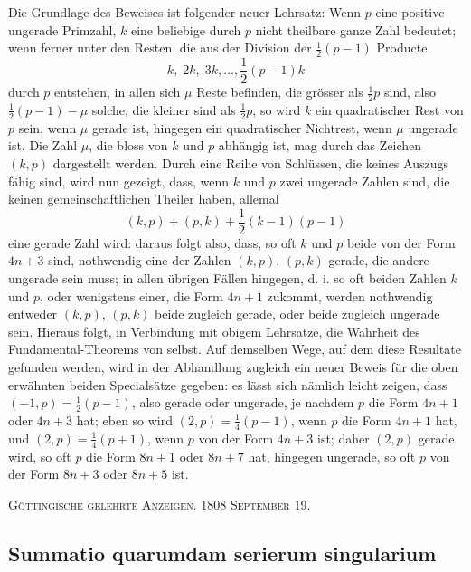 \documentclass[12pt]{article}
\begin{document}
Die Grundlage des Beweises ist folgender neuer Lehrsatz: Wenn $p$ eine positive ungerade Primzahl, $k$ eine beliebige durch $p$ nicht theilbare ganze Zahl bedeutet; wenn ferner unter den Resten, die aus der Division der $\frac12(p-1)$ Producte
\[
 k,\;2k,\;3k,\ldots,\frac12(p-1)k
\]
durch $p$ entstehen, in allen sich $\mu$ Reste befinden, die grösser als $\frac12 p$ sind, also $\frac12(p-1)-\mu$ solche, die kleiner sind als $\frac12p$, so wird $k$ ein quadratischer Rest von $p$ sein, wenn $\mu$ gerade ist, hingegen ein quadratischer Nichtrest, wenn $\mu$ ungerade ist. Die Zahl $\mu$, die bloss von $k$ und $p$ abhängig ist, mag durch das Zeichen $(k,p)$ dargestellt werden. Durch eine Reihe von Schlüssen, die keines Auszugs fähig sind, wird nun gezeigt, dass, wenn $k$ und $p$ zwei ungerade Zahlen sind, die keinen gemeinschaftlichen Theiler haben, allemal
\[
 (k,p)+(p,k)+\frac12(k-1)(p-1)
\]
eine gerade Zahl wird: daraus folgt also, dass, so oft $k$ und $p$ beide von der Form $4n+3$ sind, nothwendig eine der Zahlen $(k,p)$, $(p,k)$ gerade, die andere ungerade sein muss; in allen übrigen Fällen hingegen, d. i. so oft beiden Zahlen $k$ und $p$, oder wenigstens einer, die Form $4n+1$ zukommt, werden nothwendig entweder $(k,p)$, $(p,k)$ beide zugleich gerade, oder beide zugleich ungerade sein. Hieraus folgt, in Verbindung mit obigem Lehrsatze, die Wahrheit des Fundamental-Theorems von selbst. Auf demselben Wege, auf dem diese Resultate gefunden werden, wird in der Abhandlung zugleich ein neuer Beweis für die oben erwähnten beiden Specialsätze gegeben: es lässt sich nämlich leicht zeigen, dass $(-1,p)=\frac12(p-1)$, also gerade oder ungerade, je nachdem $p$ die Form $4n+1$ oder $4n+3$ hat; eben so wird $(2,p)=\frac14(p-1)$, wenn $p$ die Form $4n+1$ hat, und $(2,p)=\frac14(p+1)$, wenn $p$ von der Form $4n+3$ ist; daher $(2,p)$ gerade wird, so oft $p$ die Form $8n+1$ oder $8n+7$ hat, hingegen ungerade, so oft $p$ von der Form $8n+3$ oder $8n+5$ ist.

\begin{center}
\textsc{Göttingische gelehrte Anzeigen. 1808 September 19.}
\end{center}

\subsection*{Summatio quarumdam serierum singularium}
\end{document}
